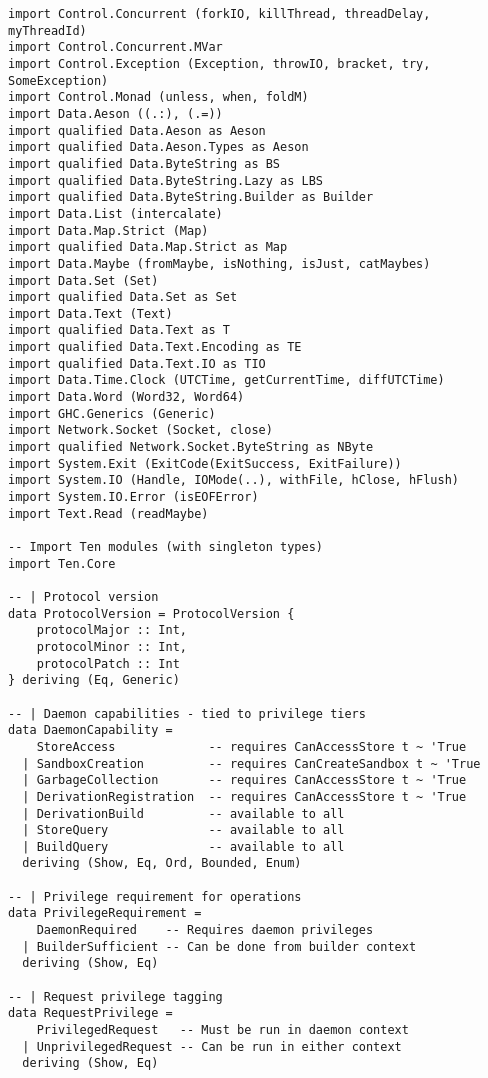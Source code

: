 \documentclass{article}
\begin{document}
\begin{tcolorbox}[title=Ten/Daemon/Protocol.hs Changes]
\begin{verbatim}
import Control.Concurrent (forkIO, killThread, threadDelay, myThreadId)
import Control.Concurrent.MVar
import Control.Exception (Exception, throwIO, bracket, try, SomeException)
import Control.Monad (unless, when, foldM)
import Data.Aeson ((.:), (.=))
import qualified Data.Aeson as Aeson
import qualified Data.Aeson.Types as Aeson
import qualified Data.ByteString as BS
import qualified Data.ByteString.Lazy as LBS
import qualified Data.ByteString.Builder as Builder
import Data.List (intercalate)
import Data.Map.Strict (Map)
import qualified Data.Map.Strict as Map
import Data.Maybe (fromMaybe, isNothing, isJust, catMaybes)
import Data.Set (Set)
import qualified Data.Set as Set
import Data.Text (Text)
import qualified Data.Text as T
import qualified Data.Text.Encoding as TE
import qualified Data.Text.IO as TIO
import Data.Time.Clock (UTCTime, getCurrentTime, diffUTCTime)
import Data.Word (Word32, Word64)
import GHC.Generics (Generic)
import Network.Socket (Socket, close)
import qualified Network.Socket.ByteString as NByte
import System.Exit (ExitCode(ExitSuccess, ExitFailure))
import System.IO (Handle, IOMode(..), withFile, hClose, hFlush)
import System.IO.Error (isEOFError)
import Text.Read (readMaybe)

-- Import Ten modules (with singleton types)
import Ten.Core

-- | Protocol version
data ProtocolVersion = ProtocolVersion {
    protocolMajor :: Int,
    protocolMinor :: Int,
    protocolPatch :: Int
} deriving (Eq, Generic)

-- | Daemon capabilities - tied to privilege tiers
data DaemonCapability =
    StoreAccess             -- requires CanAccessStore t ~ 'True
  | SandboxCreation         -- requires CanCreateSandbox t ~ 'True
  | GarbageCollection       -- requires CanAccessStore t ~ 'True
  | DerivationRegistration  -- requires CanAccessStore t ~ 'True
  | DerivationBuild         -- available to all
  | StoreQuery              -- available to all
  | BuildQuery              -- available to all
  deriving (Show, Eq, Ord, Bounded, Enum)

-- | Privilege requirement for operations
data PrivilegeRequirement =
    DaemonRequired    -- Requires daemon privileges
  | BuilderSufficient -- Can be done from builder context
  deriving (Show, Eq)

-- | Request privilege tagging
data RequestPrivilege =
    PrivilegedRequest   -- Must be run in daemon context
  | UnprivilegedRequest -- Can be run in either context
  deriving (Show, Eq)


\end{verbatim}
\end{tcolorbox}
\end{document}
